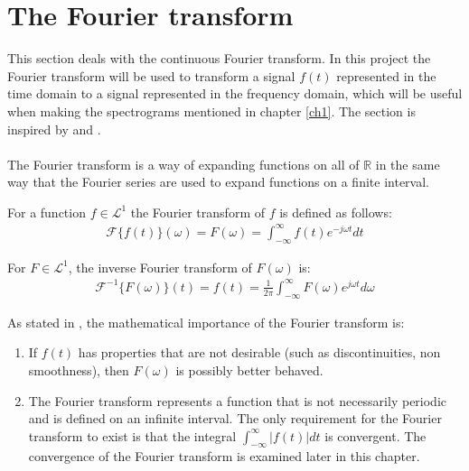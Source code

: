 \section{The Fourier transform} \label{sec:cont_Fourier_Transform}
This section deals with the continuous Fourier transform. In this project the Fourier transform will be used to transform a signal $f(t)$ represented in the time domain to a signal represented in the frequency domain, which will be useful when making the spectrograms mentioned in chapter \ref{ch1}. The section is inspired by \cite{FourierTrans} and \cite{FAA}.
\\ \\
The Fourier transform is a way of expanding functions on all of $\mathbb{R}$ in the same way that the Fourier series are used to expand functions on a finite interval.

\begin{definition} \label{def:Fourier_trans}
For a function $f \in \mathcal{L}^1$ the Fourier transform of $f$ is defined as follows:
\begin{align*}
\mathcal{F}\{f(t)\}(\omega) = F(\omega) = \int_{-\infty}^\infty f(t) e^{-j \omega t} dt
\end{align*}
\end{definition}

\begin{definition} \label{def:InverseFourier_trans}
For $F \in \mathcal{L}^1$, the inverse Fourier transform of $F(\omega)$ is:
\begin{align*}
\mathcal{F}^{-1}\{F(\omega)\}(t) = f(t) = \frac{1}{2\pi} \int_{-\infty}^\infty F(\omega) e^{j \omega t} d\omega
\end{align*}
\end{definition}

\noindent
As stated in \cite{FourierTrans}, the mathematical importance of the Fourier transform is: 
\begin{enumerate}
\item If $f(t)$ has properties that are not desirable (such as discontinuities, non smoothness), then $F(\omega)$ is possibly better behaved.
\item The Fourier transform represents a function that is not necessarily periodic and is defined on an infinite interval. The only requirement for the Fourier transform to exist is that the integral $\int_{-\infty}^\infty |f(t)| dt$ is convergent. The convergence of the Fourier transform is examined later in this chapter.
\end{enumerate}

